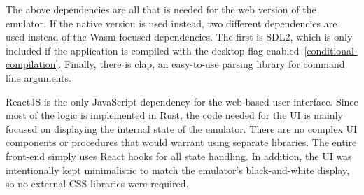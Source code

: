 The above dependencies are all that is needed for the web version of the emulator. If the native version is used instead, two different dependencies are used instead of the Wasm-focused dependencies.
The first is SDL2, which is only included if the application is compiled with the desktop flag enabled~\ref{conditional-compilation}.
Finally, there is clap, an easy-to-use parsing library for command line arguments.


ReactJS is the only JavaScript dependency for the web-based user interface.
Since most of the logic is implemented in Rust, the code needed for the UI is mainly focused on displaying the internal state of the emulator. There are no complex UI components or procedures that would warrant using separate libraries.
The entire front-end simply uses React hooks for all state handling.
In addition, the UI was intentionally kept minimalistic to match the emulator's black-and-white display, so no external CSS libraries were required.

